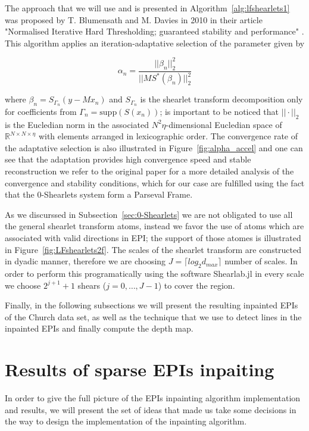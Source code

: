 The approach that we will use and is presented in Algorithm~\ref{alg:lfshearlets1} was proposed by T. Blumensath and M. Davies in 2010 in their article "Normalised Iterative Hard Thresholding; guaranteed stability and performance" \cite{hard-thresholding}. This algorithm applies an iteration-adaptative selection of the parameter given by

$$
\alpha_n=\frac{||\beta_n||_2^2}{||MS^*(\beta_n)||_2^2}
$$

where $\beta_n=S_{\Gamma_n}(y-Mx_n)$ and $S_{\Gamma_n}$ is the shearlet transform decomposition only for coefficients from $\Gamma_n=\textrm{supp}(S(x_n))$; is important to be noticed that $||\cdot||_2$ is the Eucledian norm in the associated $N^2\eta$-dimensional Eucledian space of $\mathbb{R}^{N\times N\times \eta}$ with elements arranged in lexicographic order. The convergence rate of the adaptative selection is also illustrated in Figure~\ref{fig:alpha_accel} and one can see that the adaptation provides high convergence speed and stable reconstruction we refer to the original paper \cite{hard-thresholding} for a more detailed analysis of the convergence and stability conditions, which for our case are fulfilled using the fact that the $0$-Shearlets system form a Parseval Frame. 

\bigskip

As we discurssed in Subsection~\ref{sec:0-Shearlets} we are not obligated to use all the general shearlet transform atoms, instead we favor the use of atoms which are associated with valid directions in EPI; the support of those atomes is illustrated in Figure~\ref{fig:LFshearlets2f}. The scales of the shearlet transform are constructed in dyadic manner, therefore we are choosing $J = \lceil log_2 d_{max}\rceil$ number of scales. In order to perform this programatically using the software Shearlab.jl in every scale we choose $2^{j+1}+1$ shears ($j=0,\ldots, J-1$) to cover the region.

\bigskip

Finally, in the following subsections we will present the resulting inpainted EPIs of the Church data set, as well as the technique that we use to detect lines in the inpainted EPIs and finally compute the depth map. 

\section{Results of sparse EPIs inpaiting}

In order to give the full picture of the EPIs inpainting algorithm implementation and results, we will present the set of ideas that made us take some decisions in the way to design the implementation of the inpainting algorithm.

